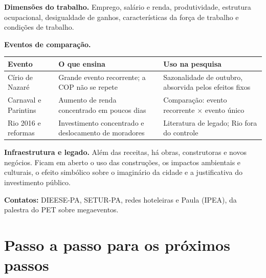 \documentclass[11pt,a4paper]{article}
\begin{document}
\textbf{Dimensões do trabalho.} Emprego, salário e renda, produtividade, estrutura ocupacional,
desigualdade de ganhos, características da força de trabalho e condições de trabalho.

\textbf{Eventos de comparação.}
\begin{table}[H]
\centering\small
\begin{tabularx}{\linewidth}{p{3.2cm}LL}
\toprule
\textbf{Evento} & \textbf{O que ensina} & \textbf{Uso na pesquisa}\\
\midrule
Círio de Nazaré & Grande evento recorrente; a COP não se repete & Sazonalidade de outubro, absorvida pelos efeitos fixos\\
Carnaval e Parintins & Aumento de renda concentrado em poucos dias & Comparação: evento recorrente $\times$ evento único\\
Rio 2016 e reformas & Investimento concentrado e deslocamento de moradores & Literatura de legado; Rio fora do controle\\
\bottomrule
\end{tabularx}
\end{table}

\textbf{Infraestrutura e legado.} Além das receitas, há obras, construtoras e novos negócios. Ficam em
aberto o uso das construções, os impactos ambientais e culturais, o efeito simbólico sobre o imaginário
da cidade e a justificativa do investimento público.

\textbf{Contatos:} DIEESE-PA, SETUR-PA, redes hoteleiras e Paula (IPEA), da palestra do PET sobre
megaeventos.

\section{Passo a passo para os próximos passos}
\end{document}
